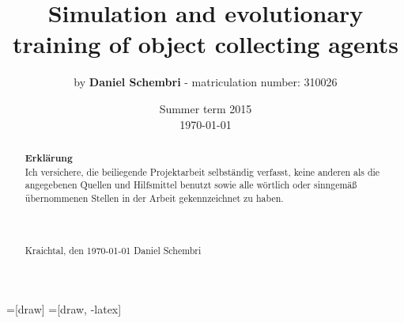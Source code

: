\documentclass[10pt,a4paper,DIV=11]{scrreprt}
\title
{
    Simulation and evolutionary training of object collecting agents\\
}
\author
{
    by \textbf{Daniel Schembri} - matriculation number: 310026
}
\date
{
    Summer term 2015 \\
    \today{}
}
\begin{document}
=[draw]
=[draw, -latex] 


\maketitle
\thispagestyle{empty}
\newpage
{\large\tableofcontents}




\begin{abstract} 

\huge{\textbf{Erklärung}} \\

\normalsize
Ich versichere, die beiliegende Projektarbeit selbständig verfasst, keine anderen als die angegebenen Quellen und Hilfsmittel benutzt sowie alle wörtlich oder sinngemäß übernommenen Stellen in der Arbeit gekennzeichnet zu haben. \\ \\ \\ \\

Kraichtal, den \today{} \hspace{8cm} Daniel Schembri
\end{abstract}
\end{document}
